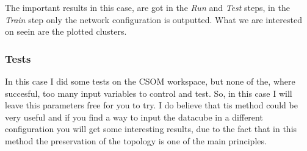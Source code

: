 \documentclass[11pt,fleqn]{book} %
\begin{document}
{																																																																																																																																																																																																																																																																																																	     The important results in this case, are got in the \emph{Run} and \emph{Test} steps, in the \emph{Train} step only the network configuration is outputted. What we are interested on seein are the plotted clusters.
																																																																																																																																																																																																																																																																																																	     \subsubsection{Tests}
																																																																																																																																																																																																																																																																																																	     In this case I did some tests on the CSOM workspace, but none of the, where succesful, too many input variables to control and test. So, in this case I will leave this parameters free for you to try. I do believe that tis method could be very useful and if you find a way to input the datacube in a different configuration you will get some interesting results, due to the fact that in this method the preservation of the topology is one of the main principles.




}
\end{document}
